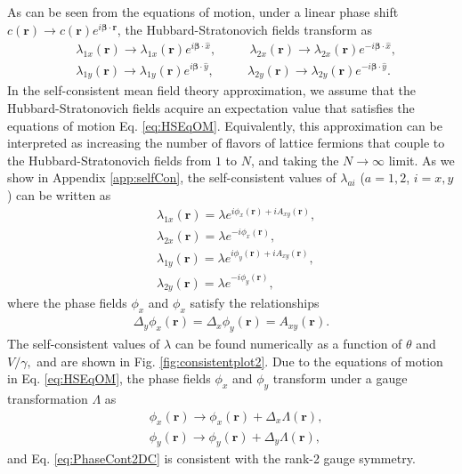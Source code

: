 \documentclass[prb,aps,twocolumn,groupaddress,floatfix]{revtex4-1}
\begin{document}
As can be seen from the equations of motion, under a linear phase shift $c(\bm{r})\rightarrow c(\bm{r})e^{i\bm{\beta}\cdot \bm{r}}$, the Hubbard-Stratonovich fields transform as 
\begin{equation}
\begin{split}
& \lambda_{1x}(\bm{r})\rightarrow \lambda_{1x}(\bm{r})e^{i\bm{\beta}\cdot \hat{x}}, \phantom{==} \lambda_{2x}(\bm{r})\rightarrow \lambda_{2x}(\bm{r})e^{-i\bm{\beta}\cdot \hat{x}},\\ 
&\lambda_{1y}(\bm{r})\rightarrow \lambda_{1y}(\bm{r})e^{i\bm{\beta}\cdot \hat{y}}, \phantom{==} \lambda_{2y}(\bm{r})\rightarrow \lambda_{2y}(\bm{r})e^{-i\bm{\beta}\cdot \hat{y}}.
\end{split}\label{eq:HSLinearTransformation}
\end{equation}
In the self-consistent mean field theory approximation, we assume that the Hubbard-Stratonovich fields acquire an expectation value that satisfies the equations of motion Eq. \ref{eq:HSEqOM}. Equivalently, this approximation can be interpreted as increasing the number of flavors of lattice fermions that couple to the Hubbard-Stratonovich fields from $1$ to $N$, and taking the $N \rightarrow \infty$ limit\cite{zinn2002quantum}.
As we show in Appendix \ref{app:selfCon}, the self-consistent values of $\lambda_{ai}$ ($a = 1,2$, $i=x,y$) can be written as
\begin{equation}
\begin{split}
&\lambda_{1x}(\bm{r})=  \lambda e^{i\phi_x(\bm{r})+iA_{xy}(\bm{r})},\\
&\lambda_{2x}(\bm{r})=  \lambda e^{-i\phi_x(\bm{r})},\\
&\lambda_{1y}(\bm{r})=  \lambda e^{i\phi_y(\bm{r})+iA_{xy}(\bm{r})},\\
&\lambda_{2y}(\bm{r})=  \lambda e^{-i\phi_y(\bm{r})},
\end{split}\label{eq:ConsistentHS2DC}
\end{equation}
where the phase fields $\phi_x$ and $\phi_x$ satisfy the relationships
\begin{equation}
\begin{split}
\Delta_y\phi_x(\bm{r}) = \Delta_x\phi_y(\bm{r}) = A_{xy}(\bm{r}).
\end{split}\label{eq:PhaseCont2DC}
\end{equation}
The self-consistent values of $\lambda$ can be found numerically as a function of $\theta$ and $V/\gamma,$ and are shown in Fig. \ref{fig:consistentplot2}. Due to the equations of motion in Eq. \ref{eq:HSEqOM}, the phase fields $\phi_x$ and $\phi_y$ transform under a gauge transformation $\Lambda$ as 
\begin{equation}
\begin{split}
&\phi_x(\bm{r})\rightarrow \phi_x(\bm{r}) + \Delta_x \Lambda(\bm{r}),\\
&\phi_y(\bm{r})\rightarrow \phi_y(\bm{r}) + \Delta_y \Lambda(\bm{r}),
\end{split}\label{eq:HSGaugeTransform}
\end{equation}
and Eq. \ref{eq:PhaseCont2DC} is consistent with the rank-2 gauge symmetry. 
\end{document}
